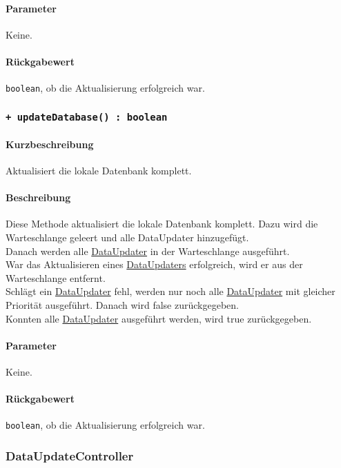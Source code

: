 \paragraph*{Parameter}
Keine.
\paragraph*{Rückgabewert}
\texttt{boolean}, ob die Aktualisierung erfolgreich war.

\subsubsection*{\texttt{+ updateDatabase() : boolean}}\label{App_DocumentViewer_IDataupdateController_updateDatabase}%
\paragraph*{Kurzbeschreibung}
Aktualisiert die lokale Datenbank komplett.
\paragraph*{Beschreibung}
Diese Methode aktualisiert die lokale Datenbank komplett. 
Dazu wird die Warteschlange geleert und alle DataUpdater hinzugefügt.\\
Danach werden alle \hyperref[App_DocumentViewer_DataUpdater]{DataUpdater} in der Warteschlange ausgeführt.\\
War das Aktualisieren eines \hyperref[App_DocumentViewer_DataUpdater]{DataUpdaters} erfolgreich, wird er aus der Warteschlange entfernt.\\
Schlägt ein \hyperref[App_DocumentViewer_DataUpdater]{DataUpdater} fehl, werden nur noch alle \hyperref[App_DocumentViewer_DataUpdater]{DataUpdater} mit gleicher Priorität 
ausgeführt. Danach wird false zurückgegeben.\\
Konnten alle \hyperref[App_DocumentViewer_DataUpdater]{DataUpdater} ausgeführt werden, wird true zurückgegeben.
\paragraph*{Parameter}
Keine.
\paragraph*{Rückgabewert}
\texttt{boolean}, ob die Aktualisierung erfolgreich war.

\subsubsection{DataUpdateController}\label{App_DocumentViewer_DataupdateController}
